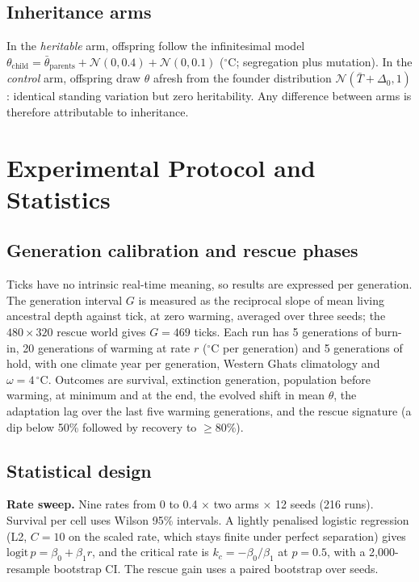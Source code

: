\documentclass[conference]{IEEEtran}
\begin{document}
\subsection{Inheritance arms}
In the \emph{heritable} arm, offspring follow the infinitesimal model
$\theta_{\text{child}}=\bar\theta_{\text{parents}}+\mathcal{N}(0,0.4)+\mathcal{N}(0,0.1)$
($^{\circ}$C; segregation plus mutation). In the \emph{control} arm, offspring draw
$\theta$ afresh from the founder distribution $\mathcal{N}(\bar T+\Delta_0,1)$:
identical standing variation but zero heritability. Any difference between arms is
therefore attributable to inheritance.

\section{Experimental Protocol and Statistics}
\label{sec:protocol}
\subsection{Generation calibration and rescue phases}
Ticks have no intrinsic real-time meaning, so results are expressed per generation.
The generation interval $G$ is measured as the reciprocal slope of mean living
ancestral depth against tick, at zero warming, averaged over three seeds; the
$480\times320$ rescue world gives $G=469$ ticks. Each run has 5 generations of
burn-in, 20 generations of warming at rate $r$ ($^{\circ}$C per generation) and
5 generations of hold, with one climate year per generation, Western Ghats
climatology and $\omega=4\,^{\circ}$C. Outcomes are survival, extinction
generation, population before warming, at minimum and at the end, the evolved
shift in mean $\theta$, the adaptation lag over the last five warming generations,
and the rescue signature (a dip below 50\% followed by recovery to $\ge80\%$).

\subsection{Statistical design}
\textbf{Rate sweep.} Nine rates from 0 to 0.4 $\times$ two arms $\times$ 12 seeds
(216 runs). Survival per cell uses Wilson 95\% intervals. A lightly penalised
logistic regression (L2, $C=10$ on the scaled rate, which stays finite under
perfect separation) gives $\mathrm{logit}\,p=\beta_0+\beta_1 r$, and the
critical rate is $k_c=-\beta_0/\beta_1$ at $p=0.5$, with a 2{,}000-resample
bootstrap CI. The rescue gain uses a paired bootstrap over seeds.
\end{document}
